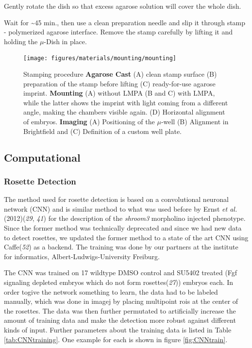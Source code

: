 \documentclass[11pt,singlespacinge,twoside]{reedthesis} %
\begin{document}
Gently rotate the dish so that excess agarose solution will cover the whole dish.

Wait for \textasciitilde{}45 min., then use a clean preparation needle and slip it through stamp - polymerized agarose interface. Remove the stamp carefully by lifting it and holding the \(\mu\)-Dish in place.


\begin{figure}

{\centering \texttt{[image: figures/materials/mounting/mounting]} 

}

\caption[Steps during improved zebrafish mounting]{Stamping procedure \textbf{Agarose Cast} (A) clean stamp surface (B) preparation of the stamp before lifting (C) ready-for-use agarose imprint. \textbf{Mounting} (A) without LMPA (B and C) with LMPA, while the latter shows the imprint with light coming from a different angle, making the chambers visible again. (D) Horizontal alignment of embryos. \textbf{Imaging} (A) Positioning of the \(\mu\)-well (B) Alignment in Brightfield and (C) Definition of a custom well plate.}\label{fig:stampprod}
\end{figure}
\hypertarget{comp-met}{%
\subsection{Computational}\label{comp-met}}

\hypertarget{CNN}{%
\subsubsection{Rosette Detection}\label{CNN}}

The method used for rosette detection is based on a convolutional neuronal network (CNN) and is similar method to what was used before by Ernst \emph{et al.}(2012)(\emph{29}, \emph{41}) for the description of the \emph{shroom3} morpholino injected phenotype. Since the former method was technically deprecated and since we had new data to detect rosettes, we updated the former method to a state of the art CNN using Caffe(\emph{52}) as a backend. The training was done by our partners at the institute for informatics, Albert-Ludwigs-University Freiburg.

The CNN was trained on 17 wildtype DMSO control and SU5402 treated (Fgf signaling depleted embryos which do not form rosettes(\emph{27})) embryos each. In order togive the network something to learn, the data had to be labeled manually, which was done in imagej by placing multipoint rois at the center of the rosettes. The data was then further permutated to artificially increase the amount of training data and make the detection more robust against different kinds of input. Further parameters about the training data is listed in Table \ref{tab:CNNtraining}. One example for each is shown in figure \ref{fig:CNNtrain}.
\end{document}
